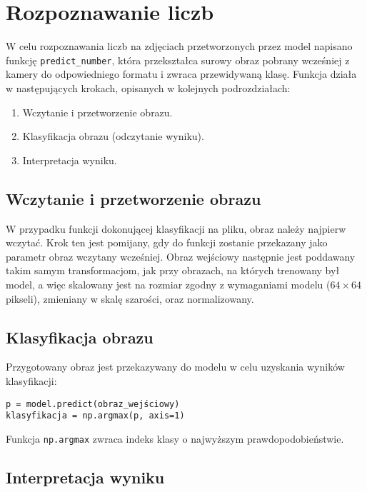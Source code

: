 \section{Rozpoznawanie liczb}\label{sec:funkcja-predict}

W celu rozpoznawania liczb na zdjęciach przetworzonych przez model napisano funkcję \texttt{predict\_number},
która przekształca surowy obraz pobrany wcześniej z kamery do odpowiedniego formatu i zwraca przewidywaną klasę.
Funkcja działa w następujących krokach, opisanych w kolejnych podrozdziałach:
\begin{enumerate}
    \item Wczytanie i przetworzenie obrazu.
    \item Klasyfikacja obrazu (odczytanie wyniku).
    \item Interpretacja wyniku.
\end{enumerate}

\subsection{Wczytanie i przetworzenie obrazu}\label{subsec:wczytanie-i-przetworzenie-obrazu}

W przypadku funkcji dokonującej klasyfikacji na pliku, obraz należy najpierw wczytać.
Krok ten jest pomijany, gdy do funkcji zostanie przekazany jako parametr obraz wczytany wcześniej.
Obraz wejściowy następnie jest poddawany takim samym transformacjom, jak przy obrazach, na których trenowany był model,
a więc skalowany jest na rozmiar zgodny z wymaganiami modelu ($64 \times 64$ pikseli), zmieniany w skalę szarości, oraz normalizowany.

\subsection{Klasyfikacja obrazu}\label{subsec:klasyfikacja-obrazu}

Przygotowany obraz jest przekazywany do modelu w celu uzyskania wyników klasyfikacji:

\begin{verbatim}
p = model.predict(obraz_wejściowy)
klasyfikacja = np.argmax(p, axis=1)
\end{verbatim}

Funkcja \texttt{np.argmax} zwraca indeks klasy o najwyższym prawdopodobieństwie.

\subsection{Interpretacja wyniku}\label{subsec:interpretacja-wyniku}


